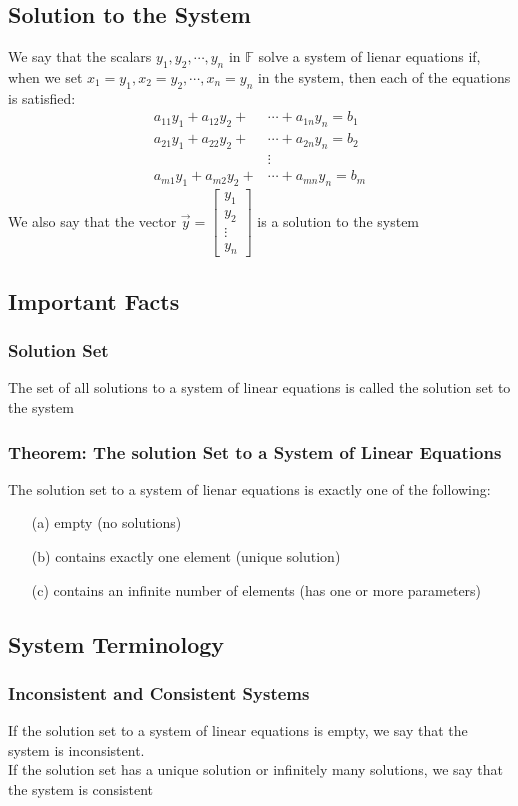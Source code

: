 \documentclass[12pt, letterpaper]{article}
\begin{document}
\subsection{Solution to the System}
We say that the scalars $y_1, y_2, \cdots, y_n$ in $\mathbb{F}$ solve a system of lienar 
equations if, when we set $x_1=y_1, x_2=y_2, \cdots, x_n=y_n$ in the system, then each of the
equations is satisfied: 
\begin{align*}
    a_{11}y_1 + a_{12}y_2 + &\cdots + a_{1n}y_n = b_1 \\
    a_{21}y_1 + a_{22}y_2 + &\cdots + a_{2n}y_n = b_2 \\
    &\vdots \\
    a_{m1}y_1 + a_{m2}y_2 + &\cdots + a_{mn}y_n = b_m
\end{align*}
We also say that the vector $\vec{y} = \begin{bmatrix}
    y_1 \\ y_2 \\ \vdots \\ y_n
\end{bmatrix}$ is a solution to the system
\subsection{Important Facts}
\subsubsection{Solution Set}
The set of all solutions to a system of linear equations is called the solution set to the system 
\subsubsection{Theorem: The solution Set to a System of Linear Equations}
The solution set to a system of lienar equations is exactly one of the following: 
\begin{enumerate}
    \item[(a)] empty (no solutions)
    \item[(b)] contains exactly one element (unique solution)
    \item[(c)] contains an infinite number of elements (has one or more parameters)
\end{enumerate}
\subsection{System Terminology}
\subsubsection{Inconsistent and Consistent Systems}
If the solution set to a system of linear equations is empty, we say that the system is inconsistent. \\
If the solution set has a unique solution or infinitely many solutions, we say that the system is consistent 
\end{document}
